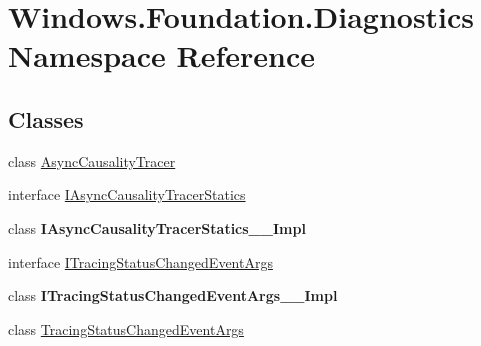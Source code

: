 \hypertarget{namespace_windows_1_1_foundation_1_1_diagnostics}{}\section{Windows.\+Foundation.\+Diagnostics Namespace Reference}
\label{namespace_windows_1_1_foundation_1_1_diagnostics}
\subsection*{Classes}
\begin{DoxyCompactItemize}
\item 
class \hyperlink{class_windows_1_1_foundation_1_1_diagnostics_1_1_async_causality_tracer}{Async\+Causality\+Tracer}
\item 
interface \hyperlink{interface_windows_1_1_foundation_1_1_diagnostics_1_1_i_async_causality_tracer_statics}{I\+Async\+Causality\+Tracer\+Statics}
\item 
class {\bfseries I\+Async\+Causality\+Tracer\+Statics\+\_\+\+\_\+\+Impl}
\item 
interface \hyperlink{interface_windows_1_1_foundation_1_1_diagnostics_1_1_i_tracing_status_changed_event_args}{I\+Tracing\+Status\+Changed\+Event\+Args}
\item 
class {\bfseries I\+Tracing\+Status\+Changed\+Event\+Args\+\_\+\+\_\+\+Impl}
\item 
class \hyperlink{class_windows_1_1_foundation_1_1_diagnostics_1_1_tracing_status_changed_event_args}{Tracing\+Status\+Changed\+Event\+Args}
\end{DoxyCompactItemize}
